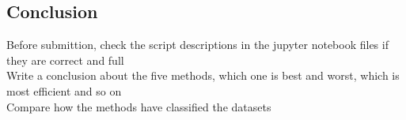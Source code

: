 \documentclass[12pt]{report}
\begin{document}
	\subsection*{Conclusion}
	\newpage
	Before submittion, check the script descriptions in the jupyter notebook files if they are correct and full\\
	
	Write a conclusion about the five methods, which one is best and worst, which is most efficient and so on
	\\
	Compare how the methods have classified the datasets
	 
	 
\end{document}
